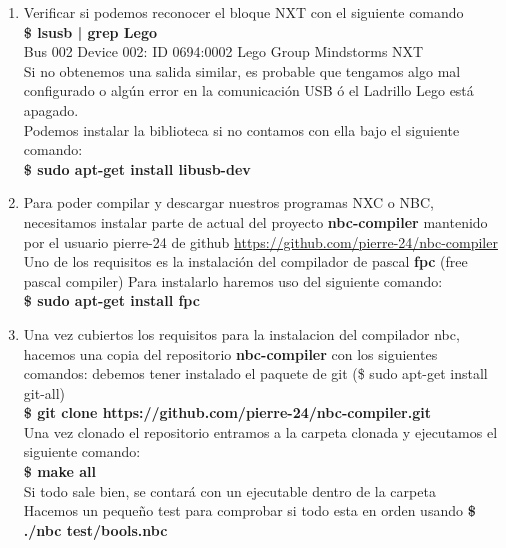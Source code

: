 \documentclass[oneside,onecolumn]{article}
\begin{document}
\begin{enumerate}
\item Verificar si podemos reconocer el bloque NXT con el siguiente comando\\
  \textbf{\$ lsusb | grep Lego}\\
  Bus 002 Device 002: ID 0694:0002 Lego Group Mindstorms NXT\\

  Si no obtenemos una salida similar, es probable que tengamos algo mal configurado o algún error en la comunicación USB ó el Ladrillo Lego está apagado.\\

  Podemos instalar la biblioteca si no contamos con ella bajo el siguiente comando:\\

  \textbf{\$ sudo apt-get install libusb-dev}
  
\item Para poder compilar y descargar nuestros programas NXC o NBC, necesitamos instalar parte de actual del proyecto \textbf{nbc-compiler} mantenido por el usuario pierre-24 de github \url{https://github.com/pierre-24/nbc-compiler}\\
  
  Uno de los requisitos es la instalación del compilador de pascal \textbf{fpc} (free pascal compiler) Para instalarlo haremos uso del siguiente comando:\\

  \textbf{\$ sudo apt-get install fpc}

\item Una vez cubiertos los requisitos para la instalacion del compilador nbc, hacemos una copia del repositorio \textbf{nbc-compiler} con los siguientes comandos:
  debemos tener instalado el paquete de git (\$ sudo apt-get install git-all)\\

  \textbf{\$ git clone https://github.com/pierre-24/nbc-compiler.git}\\

  Una vez clonado el repositorio entramos a la carpeta clonada y ejecutamos el siguiente comando:\\

  \textbf{\$ make all}\\

  Si todo sale bien, se contará con un ejecutable dentro de la carpeta\\
  Hacemos un pequeño test para comprobar si todo esta en orden usando \textbf{\$ ./nbc test/bools.nbc}\\


\end{enumerate}
\end{document}
